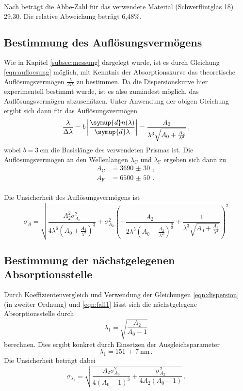 Nach \cite{flint} beträgt die Abbe-Zahl für das verwendete Material (Schwerflintglas 18)
29{,}30. Die relative Abweichung beträgt 6{,}48\%.

\subsection{Bestimmung des Auflösungsvermögens}
\label{subsec:auflösung}
Wie in Kapitel \ref{subsec:messung} dargelegt wurde, ist es durch Gleichung \eqref{eqn:aufloesung} möglich,
mit Kenntnis der Absorptionskurve das theoretische Auflösungsvermögen $\frac{\lambda}{\Delta \lambda}$ zu bestimmen.
Da die Dispersionskurve hier experimentell bestimmt wurde, ist es also zumindest möglich.
das Auflösungsvermögen abzuschätzen. Unter Anwendung der obigen Gleichung ergibt sich dann
für das Auflösungsvermögen
\begin{equation}
  \frac{\lambda}{\Delta \lambda} = b \left|\frac{\symup{d}n(\lambda)}{\symup{d}\lambda}\right| = \frac{A_2}{\lambda^3\sqrt{A_0 + \frac{A_2}{\lambda^2}}}\,,
\end{equation}
wobei $b = \SI{3}{\centi\meter}$ die Basislänge des verwendeten Prismas ist.
Die Auflösungsvermögen an den Wellenlängen $\lambda_\text{C}$ und $\lambda_\text{F}$
ergeben sich dann zu
\begin{align*}
  A_\text{C} &= \SI{3690(30)}{}\,, \\
  A_\text{F} &= \SI{6500(50)}{}\,. \\
\end{align*}

Die Unsicherheit des Auflösungsvermögens ist
\begin{equation*}
  \sigma_A = \sqrt{\frac{A_2^{2} \sigma_{A_0}^{2}}{4 \lambda^{6} \left(A_0 + \frac{A_2}{\lambda^{2}}\right)^{3}}
  + \sigma_{A_2}^{2} \left(- \frac{A_2}{2 \lambda^{5} \left(A_0 + \frac{A_2}{\lambda^{2}}\right)^{\frac{3}{2}}}
  + \frac{1}{\lambda^{3} \sqrt{A_0 + \frac{A_2}{\lambda^{2}}}}\right)^{2}}
\end{equation*}

\subsection{Bestimmung der nächstgelegenen Absorptionsstelle}
\label{subsec:absorptionsstelle}
Durch Koeffizientenvergleich und Verwendung der Gleichungen \eqref{eqn:dispersion} (in zweiter Ordnung)
und \eqref{eqn:fall1} lässt sich die nächstgelegene Absorptionsstelle durch
\begin{equation*}
  \lambda_1 = \sqrt{\frac{A_2}{A_0-1}}
\end{equation*}
berechnen. Dies ergibt konkret durch Einsetzen der Ausgleichsparameter
\begin{equation*}
  \lambda_1 = \SI{151(7)}{\nano\meter}\,.
\end{equation*}
Die Unsicherheit beträgt dabei
\begin{equation*}
  \sigma_{\lambda_1} = \sqrt{\frac{A_{2} \sigma_{A_{0}}^{2}}{4 \left(A_{0} - 1\right)^{3}} + \frac{\sigma_{A_{2}}^{2}}{4 A_{2} \left(A_{0} - 1\right)}}\,.
\end{equation*}
